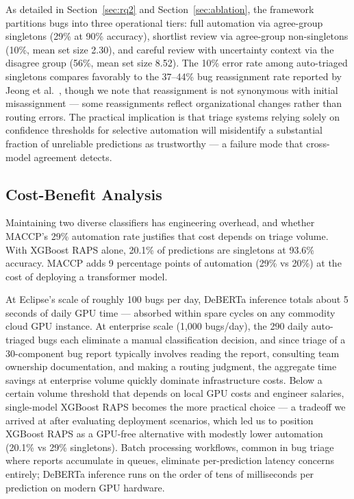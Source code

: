 \documentclass[conference]{IEEEtran}
\begin{document}
As detailed in Section~\ref{sec:rq2} and Section~\ref{sec:ablation}, the framework partitions bugs into three operational tiers: full automation via agree-group singletons (29\% at 90\% accuracy), shortlist review via agree-group non-singletons (10\%, mean set size 2.30), and careful review with uncertainty context via the disagree group (56\%, mean set size 8.52). The 10\% error rate among auto-triaged singletons compares favorably to the 37--44\% bug reassignment rate reported by Jeong et al.~\cite{jeong2009improving}, though we note that reassignment is not synonymous with initial misassignment --- some reassignments reflect organizational changes rather than routing errors. The practical implication is that triage systems relying solely on confidence thresholds for selective automation will misidentify a substantial fraction of unreliable predictions as trustworthy --- a failure mode that cross-model agreement detects.

\subsection{Cost-Benefit Analysis}

Maintaining two diverse classifiers has engineering overhead, and whether MACCP's 29\% automation rate justifies that cost depends on triage volume. With XGBoost RAPS alone, 20.1\% of predictions are singletons at 93.6\% accuracy. MACCP adds 9 percentage points of automation (29\% vs 20\%) at the cost of deploying a transformer model.

At Eclipse's scale of roughly 100 bugs per day, DeBERTa inference totals about 5 seconds of daily GPU time --- absorbed within spare cycles on any commodity cloud GPU instance. At enterprise scale (1,000 bugs/day), the 290 daily auto-triaged bugs each eliminate a manual classification decision, and since triage of a 30-component bug report typically involves reading the report, consulting team ownership documentation, and making a routing judgment, the aggregate time savings at enterprise volume quickly dominate infrastructure costs. Below a certain volume threshold that depends on local GPU costs and engineer salaries, single-model XGBoost RAPS becomes the more practical choice --- a tradeoff we arrived at after evaluating deployment scenarios, which led us to position XGBoost RAPS as a GPU-free alternative with modestly lower automation (20.1\% vs 29\% singletons). Batch processing workflows, common in bug triage where reports accumulate in queues, eliminate per-prediction latency concerns entirely; DeBERTa inference runs on the order of tens of milliseconds per prediction on modern GPU hardware.
\end{document}
